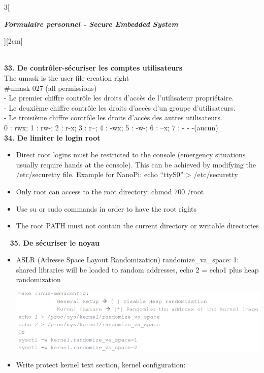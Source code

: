 \begin{multicols}{3}[\centerline{ \large\em \textbf{Formulaire personnel - Secure Embedded System}}][2cm]
\begin{minipage}{\linewidth}
\end{minipage}
\\ \textbf{33. De contrôler-sécuriser les comptes utilisateurs\\}
The umask is the user file creation right\\
\#umask 027 (all permissions)\\
- Le premier chiffre contrôle les droits d'accès de l'utilisateur propriétaire.\\
- Le deuxième chiffre contrôle les droits d'accès d'un groupe d'utilisateurs.\\
- Le troisième chiffre contrôle les droits d'accès des autres utilisateurs.\\
0 : rwx; 1 : rw-; 2 : r-x; 3 : r--; 4 : -wx; 5 : -w-; 6 : --x; 7 : - - -(aucun)
\\ \textbf{34. De limiter le login root}
\begin{itemize}
\item Direct root logins must be restricted to the console (emergency situations usually require
hands at the console). This can be achieved by modifying the /etc/securetty file.
Example for NanoPi: echo “ttyS0” > /etc/securetty
\item Only root can access to the root directory: chmod 700 /root
\item Use su or sudo commands in order to have the root rights
\item The root PATH must not contain the current directory or writable directories
\end{itemize}~
\textbf{35. De sécuriser le noyau}~
\begin{itemize}
\item ASLR (Adresse Space Layout Randomization) randomize\_va\_space: 1: shared libraries will be loaded to random addresses, echo 2 = echo1 plus heap randomization\\
\begin{minipage}{\linewidth}
	\centering
    \includegraphics[width =0.8\columnwidth]{images/19.png}
\end{minipage}
\item Write protect kernel text section, kernel configuration:\\

\end{itemize}
\end{multicols}
